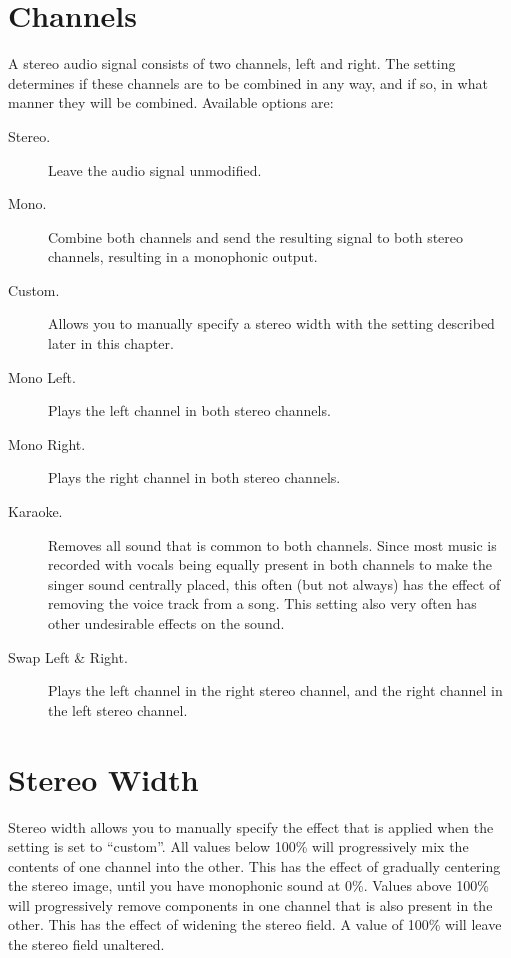 \section{Channels}
  A stereo audio signal consists of two channels, left and right. The
   setting determines if these channels are to be combined in
  any way, and if so, in what manner they will be combined.
  Available options are:
  \begin{description}
      \item[Stereo.]
          Leave the audio signal unmodified.
      \item[Mono.]
          Combine both channels and send the resulting signal to both stereo
          channels, resulting in a monophonic output.
      \item[Custom.]
          Allows you to manually specify a stereo width with the
           setting described later in this chapter.
      \item[Mono Left.]
          Plays the left channel in both stereo channels.
      \item[Mono Right.]
          Plays the right channel in both stereo channels.
      \item[Karaoke.]
          Removes all sound that is common to both channels. Since most
          music is recorded with vocals being equally present in both channels
          to make the singer sound centrally placed, this often (but not
          always) has the effect of removing the voice track from a song. This
          setting also very often has other undesirable effects on the sound.
      \item[Swap Left \& Right.]
          Plays the left channel in the right stereo channel, and the right
          channel in the left stereo channel.
  \end{description}

\section{Stereo Width}
  Stereo width allows you to manually specify the effect that is applied
  when the  setting is set to ``custom''.
  All values below 100\% will progressively mix the contents of one channel
  into the other. This has the effect of gradually centering the stereo image,
  until you have monophonic sound at 0\%. Values above 100\% will progressively
  remove components in one channel that is also present in the other. This has
  the effect of widening the stereo field. A value of 100\% will leave the
  stereo field unaltered.

